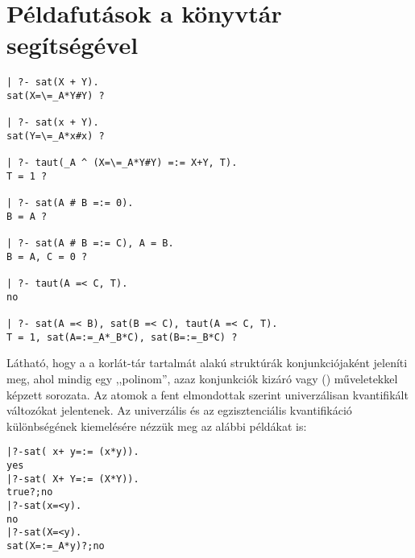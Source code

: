 
\section{Példafutások a \clpb könyvtár segítségével}

\begin{verbatim}
| ?- sat(X + Y).
sat(X=\=_A*Y#Y) ? 

| ?- sat(x + Y).
sat(Y=\=_A*x#x) ? 

| ?- taut(_A ^ (X=\=_A*Y#Y) =:= X+Y, T).
T = 1 ? 

| ?- sat(A # B =:= 0).
B = A ? 

| ?- sat(A # B =:= C), A = B.
B = A, C = 0 ? 

| ?- taut(A =< C, T).
no

| ?- sat(A =< B), sat(B =< C), taut(A =< C, T).
T = 1, sat(A=:=_A*_B*C), sat(B=:=_B*C) ? 
\end{verbatim}

Látható, hogy a \clpb a korlát-tár tartalmát  alakú
struktúrák konjunkciójaként jeleníti meg, ahol  mindig egy
,,polinom'', azaz konjunkciók kizáró vagy (\cd{\#}) műveletekkel képzett
sorozata. Az atomok a fent elmondottak szerint univerzálisan kvantifikált
változókat jelentenek. Az univerzális és az egzisztenciális kvantifikáció
különbségének kiemelésére nézzük meg az alábbi példákat is:

\begin{alltt}
| ?- sat(~x+ ~y=:= ~(x*y)).   % \(\forall\cd{xy}(\lnot\cd{x}\lor\lnot\cd{y}=\lnot(\cd{x}\land\cd{y}))\)
yes
| ?- sat(~X+ ~Y=:= ~(X*Y)).   % \(\exists?\cd{XY}(\lnot\cd{X}\lor\lnot\cd{Y}=\lnot(\cd{X}\land\cd{Y}))\)
true ? ; no
| ?- sat(x=<y).               % \(\forall\cd{xy}(\cd{x} \to \cd{y})\)
no
| ?- sat(X=<y).               % \(\forall\cd{y}\exists?\cd{X}(\cd{X} \to \cd{y})\) 
sat(X=:=_A*y) ? ; no
\end{alltt}

